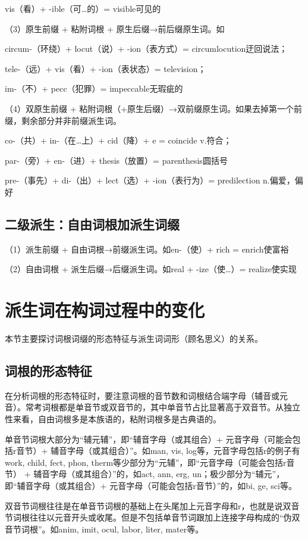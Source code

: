 vis（看）+ -ible（可…的）= visible可见的

（3）原生前缀 + 粘附词根 + 原生后缀→前后缀原生词。如

circum-（环绕）+ locut（说）+ -ion（表方式）= circumlocution迂回说法；

tele-（远）+ vis（看）+ -ion（表状态）= television；

im-（不）+ pecc（犯罪）= impeccable无瑕疵的

（4）双原生前缀 + 粘附词根（+原生后缀）→双前缀原生词。如果去掉第一个前缀，剩余部分并非前缀派生词。

co-（共）+ in-（在…上）+ cid（降）+ e = coincide v.符合；

par-（旁）+ en-（进）+ thesis（放置）= parenthesis圆括号

pre-（事先）+ di-（出）+ lect（选）+ -ion（表行为）= predilection n.偏爱，偏好

\subsection{二级派生：自由词根加派生词缀}
（1）派生前缀 + 自由词根→前缀派生词。如en-（使）+ rich = enrich使富裕

（2）自由词根 + 派生后缀→后缀派生词。如real + -ize（使…）= realize使实现

\section{派生词在构词过程中的变化}
本节主要探讨词根词缀的形态特征与派生词词形（顾名思义）的关系。
\subsection{词根的形态特征}
在分析词根的形态特征时，要注意词根的音节数和词根结合端字母（辅音或元音）。常考词根都是单音节或双音节的，其中单音节占比显著高于双音节。从独立性来看，自由词根多是本族语的，粘附词根多是古典语的。

单音节词根大部分为“辅元辅”，即“辅音字母（或其组合）+ 元音字母（可能会包括r音节）+ 辅音字母（或其组合）”。如man, vis, log等，元音字母包括r的例子有work, child, fect, phon, therm等少部分为“元辅”，即“元音字母（可能会包括r音节） + 辅音字母（或其组合）”的，如act, ann, erg, un；极少部分为“辅元”，即“辅音字母（或其组合）+ 元音字母（可能会包括r音节）”的，如bi, ge, sci等。

双音节词根往往是在单音节词根的基础上在头尾加上元音字母和r，也就是说双音节词根往往以元音开头或收尾。但是不包括单音节词跟加上连接字母构成的“伪双音节词根”。如anim, imit, ocul, labor, liter, mater等。
